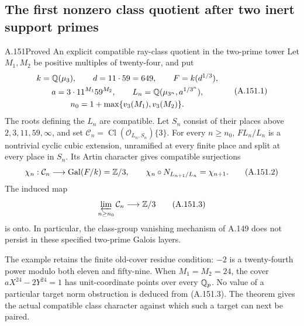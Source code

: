 \subsection{The first nonzero class quotient after two inert support primes}

\begin{statement}{A.151}{Proved}
{An explicit compatible ray-class quotient in the two-prime tower}
Let \(M_1,M_2\) be positive multiples of twenty-four,
and put
\[
 \begin{gathered}
 k=\mathbb Q(\mu_3),\qquad d=11\cdot59=649,
 \qquad F=k(d^{1/3}),\\
 a=3\cdot11^{M_1}59^{M_2},\qquad
 L_n=\mathbb Q(\mu_{3^n},a^{1/3^n}),\\
 n_0=1+\max\{v_3(M_1),v_3(M_2)\}.
 \end{gathered}
\tag{A.151.1}
\]
The roots defining the \(L_n\) are compatible.
Let \(S_n\) consist of their places above
\(2,3,11,59,\infty\), and set
\(\mathcal C_n=\operatorname{Cl}(\mathcal O_{L_n,S_n})\{3\}\).
For every \(n\geq n_0\), \(FL_n/L_n\) is a
nontrivial cyclic cubic extension, unramified at
every finite place and split at every place in
\(S_n\).
Its Artin character gives compatible surjections
\[
 \chi_n:\mathcal C_n\longrightarrow
               \operatorname{Gal}(F/k)=\mathbb Z/3,
 \qquad
 \chi_n\circ N_{L_{n+1}/L_n}=\chi_{n+1}.
\tag{A.151.2}
\]
The induced map
\[
                 \varprojlim_{n\geq n_0}\mathcal C_n
                          \longrightarrow\mathbb Z/3
\tag{A.151.3}
\]
is onto.
In particular, the class-group vanishing mechanism
of A.149 does not persist in these specified
two-prime Galois layers.

The example retains the finite old-cover residue
condition: \(-2\) is a twenty-fourth power modulo
both eleven and fifty-nine.  When \(M_1=M_2=24\),
the cover \(aX^{24}-2Y^{24}=1\) has unit-coordinate
points over every \(\mathbb Q_p\).
No value of a particular target norm obstruction is
deduced from (A.151.3).  The theorem gives the actual
compatible class character against which such a
target can next be paired.
\end{statement}
